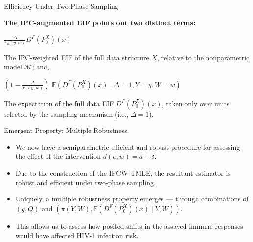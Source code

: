 \documentclass{beamer}
\newcommand{\E}{\mathbb{E}}
\newcommand{\M}{\mathcal{M}}
\begin{document}

\begin{frame}[c]{Efficiency Under Two-Phase Sampling}

\begin{center}
  \textbf{The IPC-augmented EIF points out two distinct terms:}
  \begin{tcolorbox}
    $\frac{\Delta}{\pi_0(y, w)}D^F(P_0^X)(x)$
  \end{tcolorbox}
  The IPC-weighted EIF of the full data structure $X$, relative to the
  nonparametric model $\M$; and,
  \vspace{1em}
  \begin{tcolorbox}
    $\left(1 - \frac{\Delta}{\pi_0(y, w)}\right)$ $\E(D^F(P_0^X)(x) \mid
      \Delta = 1, Y = y, W = w)$
  \end{tcolorbox}
  The expectation of the full data EIF $D^F(P_0^X)(x)$, taken only over units
  selected by the sampling mechanism (i.e., $\Delta = 1$).
\end{center}

\note{
}

\end{frame}


\begin{frame}[c]{Emergent Property: Multiple Robustness}

\begin{center}
\begin{itemize}
  \itemsep10pt
  \item We now have a semiparametric-efficient and robust procedure for
    assessing the effect of the intervention $d(a,w) = a + \delta$.
  \item Due to the construction of the IPCW-TMLE, the resultant estimator is
    robust and efficient under two-phase sampling.
  \item Uniquely, a multiple robustness property emerges --- through
    combinations of $(g, Q)$ and $(\pi(Y, W), \E(D^F(P^X_0)(x) \mid Y, W))$.
  \item This allows us to assess how posited shifts in the assayed immune
    responses would have affected HIV-1 infection risk.
\end{itemize}
\end{center}

\note{
}

\end{frame}
\end{document}
